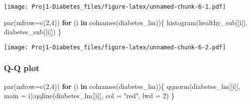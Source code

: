 \documentclass[
]{article}
\newenvironment{Shaded}{\begin{snugshade}}{\end{snugshade}}
\newcommand{\AttributeTok}[1]{\textcolor[rgb]{0.77,0.63,0.00}{#1}}
\newcommand{\ConstantTok}[1]{\textcolor[rgb]{0.00,0.00,0.00}{#1}}
\newcommand{\ControlFlowTok}[1]{\textcolor[rgb]{0.13,0.29,0.53}{\textbf{#1}}}
\newcommand{\DecValTok}[1]{\textcolor[rgb]{0.00,0.00,0.81}{#1}}
\newcommand{\FunctionTok}[1]{\textcolor[rgb]{0.00,0.00,0.00}{#1}}
\newcommand{\NormalTok}[1]{#1}
\newcommand{\OtherTok}[1]{\textcolor[rgb]{0.56,0.35,0.01}{#1}}
\newcommand{\SpecialCharTok}[1]{\textcolor[rgb]{0.00,0.00,0.00}{#1}}
\newcommand{\StringTok}[1]{\textcolor[rgb]{0.31,0.60,0.02}{#1}}
\begin{document}
\begin{Shaded}
\end{Shaded}

\texttt{[image: Proj1-Diabetes\_files/figure-latex/unnamed-chunk-6-1.pdf]}

\begin{Shaded}
\begin{Highlighting}[]
\FunctionTok{par}\NormalTok{(}\AttributeTok{mfrow=}\FunctionTok{c}\NormalTok{(}\DecValTok{2}\NormalTok{,}\DecValTok{4}\NormalTok{))}
\ControlFlowTok{for}\NormalTok{ (i }\ControlFlowTok{in} \FunctionTok{colnames}\NormalTok{(diabetes\_lm))\{}
  \FunctionTok{histogram}\NormalTok{(healthy\_sub[[i]], diabetes\_sub[[i]])}
\NormalTok{\}}
\end{Highlighting}
\end{Shaded}

\texttt{[image: Proj1-Diabetes\_files/figure-latex/unnamed-chunk-6-2.pdf]}

\hypertarget{q-q-plot}{%
\subsubsection{Q-Q plot}\label{q-q-plot}}

\begin{Shaded}
\begin{Highlighting}[]
\FunctionTok{par}\NormalTok{(}\AttributeTok{mfrow=}\FunctionTok{c}\NormalTok{(}\DecValTok{2}\NormalTok{,}\DecValTok{4}\NormalTok{))}
\ControlFlowTok{for}\NormalTok{ (i }\ControlFlowTok{in} \FunctionTok{colnames}\NormalTok{(diabetes\_lm))\{}
  \FunctionTok{qqnorm}\NormalTok{(diabetes\_lm[[i]], }\AttributeTok{main =}\NormalTok{ i);}\FunctionTok{qqline}\NormalTok{(diabetes\_lm[[i]], }\AttributeTok{col =} \StringTok{"red"}\NormalTok{, }\AttributeTok{lwd =} \DecValTok{2}\NormalTok{)}
\NormalTok{\}}
\end{Highlighting}
\end{Shaded}
\end{document}
